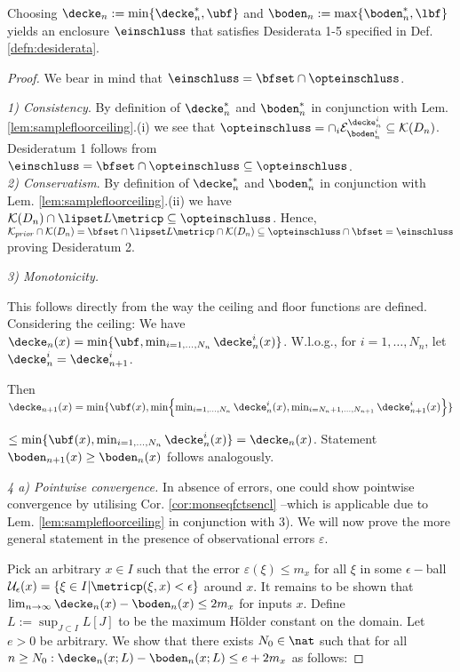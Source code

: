 \begin{thm} \label{thm:enclmain}
Choosing $\decke_n := \min\{ \decke_n^*, \ubf\}$ and $\boden_n := \max\{\boden_n^*,\lbf\}$ yields an enclosure $\einschluss$ that satisfies Desiderata 1-5 specified in Def. \ref{defn:desiderata}.
\begin{proof}
We bear in mind that $\einschluss = \bfset \cap \opteinschluss$.

\textit{1) Consistency}. By definition of $\decke_n^*$ and $\boden_n^*$ in conjunction with Lem. \ref{lem:samplefloorceiling}.(i) we see that $\opteinschluss = \cap_i \mathcal E_{\boden_n^i}^{\decke_n^i} \subseteq \mathcal K(D_n)$. Desideratum 1 follows from $\einschluss = \bfset \cap \opteinschluss \subseteq \opteinschluss$.\\

\textit{2) Conservatism}. By definition of $\decke_n^*$ and $\boden_n^*$ in conjunction with Lem. \ref{lem:samplefloorceiling}.(ii) we have $\mathcal K(D_n) \cap \lipset L \metricp \subseteq \opteinschluss $. Hence, $\mathcal K_{prior} \cap \mathcal K(D_n) =  \bfset \cap \lipset L \metricp \cap \mathcal K(D_n) \subseteq \opteinschluss \cap \bfset = \einschluss$ proving
Desideratum 2.

\textit{3) Monotonicity.} 

This follows directly from the way the ceiling and floor functions are defined. Considering the ceiling:
We have $\decke_n (x) = \min\{\ubf,\min_{i =1,...,N_n} \decke^i_{n}(x) \} $. W.l.o.g., for $i=1,\ldots,N_n$, let $\decke_n^i = \decke_{n+1}^{i}$. 

Then 
$\decke_{n+1} (x) = \min\{\ubf(x),\min\Bigl\{ \min_{i =1,...,N_n} \decke^i_{n}(x), \min_{i= N_n +1,\ldots,N_{n+1}}  
\decke^i_{n+1}(x) \Bigr\} \} $

$\leq \min \{\ubf(x), \min_{i =1,...,N_n} \decke^i_{n}(x)  \}=  \decke_{n}(x) $. Statement $\boden_{n+1} (x) \geq  \boden_{n}(x)$ follows analogously.

\textit{4 a) Pointwise convergence.} In absence of errors, one could show pointwise convergence by utilising Cor. \ref{cor:monseqfctsencl} --which is applicable due to Lem. \ref{lem:samplefloorceiling} in conjunction with 3). We will now prove the more general statement in the presence of observational errors $\varepsilon$.

Pick an arbitrary $x \in I$ such that the error $\varepsilon(\xi) \leq m_x$ for all $\xi$ in some $\epsilon-$ball $\mathcal U_\epsilon(x) = \{\xi \in I | \metricp(\xi ,x) < \epsilon \}$ around $x$.
It remains to be shown that $\lim_{n\to \infty} \decke_n(x) - \boden_n(x) \leq 2 m_x$ for inputs $x$.
Define $L := \sup_{J \subset I} L[J] $  to be the maximum H\"older constant on the domain.
Let $e>0$ be arbitrary. We show that there exists $N_0 \in \nat$ such that for all $n \geq N_0: \decke_n(x;L) - \boden_n(x;L) \leq e + 2 m_x$ as follows:


\end{proof}
\end{thm}
